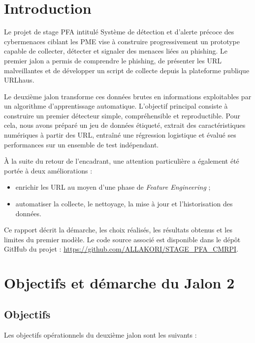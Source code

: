 \documentclass[11pt,a4paper]{report}
\begin{document}
\tableofcontents
\clearpage
{}

\chapter{Introduction}

Le projet de stage PFA intitulé \og Système de détection et d'alerte précoce
des cybermenaces ciblant les PME \fg{} vise à construire progressivement un
prototype capable de collecter, détecter et signaler des menaces liées au
phishing. Le premier jalon a permis de comprendre le phishing, de présenter
les URL malveillantes et de développer un script de collecte depuis la
plateforme publique URLhaus.

Le deuxième jalon transforme ces données brutes en informations exploitables
par un algorithme d'apprentissage automatique. L'objectif principal consiste
à construire un premier détecteur simple, compréhensible et reproductible.
Pour cela, nous avons préparé un jeu de données étiqueté, extrait des
caractéristiques numériques à partir des URL, entraîné une régression
logistique et évalué ses performances sur un ensemble de test indépendant.

À la suite du retour de l'encadrant, une attention particulière a également
été portée à deux améliorations :

\begin{itemize}
  \item enrichir les URL au moyen d'une phase de \emph{Feature Engineering} ;
  \item automatiser la collecte, le nettoyage, la mise à jour et
        l'historisation des données.
\end{itemize}

Ce rapport décrit la démarche, les choix réalisés, les résultats obtenus et
les limites du premier modèle. Le code source associé est disponible dans le
dépôt GitHub du projet :
\url{https://github.com/ALLAKORI/STAGE_PFA_CMRPI}.

\chapter{Objectifs et démarche du Jalon 2}

\section{Objectifs}

Les objectifs opérationnels du deuxième jalon sont les suivants :
\end{document}
